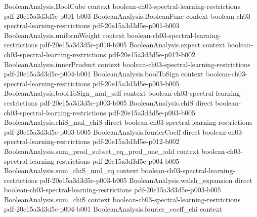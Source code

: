 \begin{lemma}
\leanok
{}
\label{KKL.lowDegree_approx}
\proofstep
  {BooleanAnalysis.BoolCube}
  {context}
  {boolean-ch03-spectral-learning-restrictions}
  {pdf-20e15a3d3d5e-p001-b003}
\proofstep
  {BooleanAnalysis.BooleanFunc}
  {context}
  {boolean-ch03-spectral-learning-restrictions}
  {pdf-20e15a3d3d5e-p001-b003}
\proofstep
  {BooleanAnalysis.uniformWeight}
  {context}
  {boolean-ch03-spectral-learning-restrictions}
  {pdf-20e15a3d3d5e-p010-b005}
\proofstep
  {BooleanAnalysis.expect}
  {context}
  {boolean-ch03-spectral-learning-restrictions}
  {pdf-20e15a3d3d5e-p012-b002}
\proofstep
  {BooleanAnalysis.innerProduct}
  {context}
  {boolean-ch03-spectral-learning-restrictions}
  {pdf-20e15a3d3d5e-p004-b001}
\proofstep
  {BooleanAnalysis.boolToSign}
  {context}
  {boolean-ch03-spectral-learning-restrictions}
  {pdf-20e15a3d3d5e-p003-b005}
\proofstep
  {BooleanAnalysis.boolToSign_mul_self}
  {context}
  {boolean-ch03-spectral-learning-restrictions}
  {pdf-20e15a3d3d5e-p003-b005}
\proofstep
  {BooleanAnalysis.chiS}
  {direct}
  {boolean-ch03-spectral-learning-restrictions}
  {pdf-20e15a3d3d5e-p003-b005}
\proofstep
  {BooleanAnalysis.chiS_mul_chiS}
  {direct}
  {boolean-ch03-spectral-learning-restrictions}
  {pdf-20e15a3d3d5e-p003-b005}
\proofstep
  {BooleanAnalysis.fourierCoeff}
  {direct}
  {boolean-ch03-spectral-learning-restrictions}
  {pdf-20e15a3d3d5e-p012-b002}
\proofstep
  {BooleanAnalysis.sum_prod_subset_eq_prod_one_add}
  {context}
  {boolean-ch03-spectral-learning-restrictions}
  {pdf-20e15a3d3d5e-p004-b005}
\proofstep
  {BooleanAnalysis.sum_chiS_mul_eq}
  {context}
  {boolean-ch03-spectral-learning-restrictions}
  {pdf-20e15a3d3d5e-p003-b005}
\proofstep
  {BooleanAnalysis.walsh_expansion}
  {direct}
  {boolean-ch03-spectral-learning-restrictions}
  {pdf-20e15a3d3d5e-p003-b005}
\proofstep
  {BooleanAnalysis.sum_chiS}
  {context}
  {boolean-ch03-spectral-learning-restrictions}
  {pdf-20e15a3d3d5e-p004-b001}
\proofstep
  {BooleanAnalysis.fourier_coeff_chi}
  {context}

\end{lemma}
